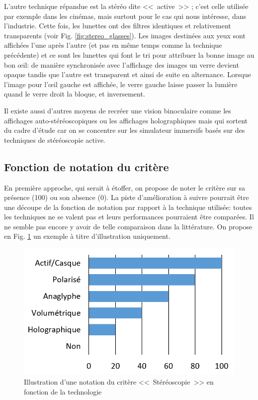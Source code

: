 	\par L'autre technique répandue est la stéréo dite <<~active~>> ; c'est celle utilisée par exemple dans les cinémas, mais surtout pour le cas qui nous intéresse, dans l'industrie. Cette fois, les lunettes ont des filtres identiques et relativement transparents (voir Fig. \ref{fig:stereo_glasses}). Les images destinées aux yeux sont affichées l'une après l'autre (et pas en même temps comme la technique précédente) et ce sont les lunettes qui font le tri pour attribuer la bonne image au bon œil: de manière synchronisée avec l'affichage des images un verre devient opaque tandis que l'autre est transparent et ainsi de suite en alternance. Lorsque l'image pour l'œil gauche est affichée, le verre gauche laisse passer la lumière quand le verre droit la bloque, et inversement.
	
	\par Il existe aussi d'autres moyens de recréer une vision binoculaire comme les affichages auto-stéréoscopiques ou les affichages holographiques mais qui sortent du cadre d'étude car on se concentre sur les simulateur immersifs basés sur des techniques de stéréoscopie active. 
	
	\subsection{Fonction de notation du critère}
	\par En première approche, qui serait à étoffer, on propose de noter le critère sur sa présence (100) ou son absence (0). La piste d'amélioration à suivre pourrait être une découpe de la fonction de notation par rapport à la technique utilisée: toutes les techniques ne se valent pas et leurs performances pourraient être comparées. Il ne semble pas encore y avoir de telle comparaison dans la littérature. On propose en Fig. \ref{fig:stereo_grade_techno} un exemple à titre d'illustration uniquement.
	
	\begin{figure}[h]
		\centering
		\includegraphics[scale=1]{Figures/StereoTechnoScore}
		\caption{Illustration d'une notation du critère <<~Stéréoscopie~>> en fonction de la technologie}
		\label{fig:stereo_grade_techno}
	\end{figure}
	
